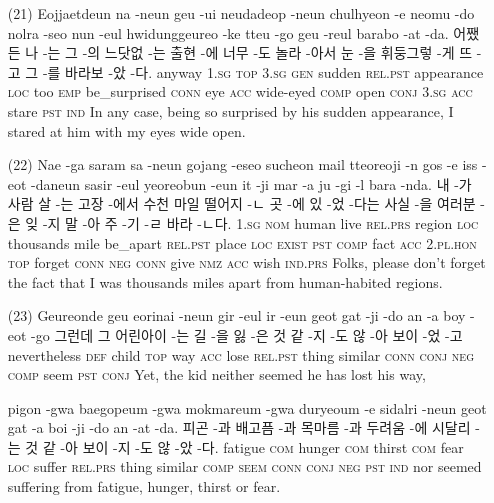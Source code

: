 \begin{itemize}
\item [(21)]
\tgl
		{Eojjaetdeun na -neun geu -ui neudadeop -neun chulhyeon -e neomu -do nolra -seo nun -eul hwidunggeureo -ke tteu -go geu -reul barabo -at -da.}
		{어쨌든 나 -는 그 -의 느닷없 -는 출현 -에 너무 -도 놀라 -아서 눈 -을 휘둥그렇 -게 뜨 -고 그 -를 바라보 -았 -다.}
		{anyway	\textsc{1.sg}	\textsc{top}	\textsc{3.sg}	\textsc{gen}	sudden	\textsc{rel.pst}	appearance	\textsc{loc}	too	\textsc{emp}	be\_surprised	\textsc{conn}	eye	\textsc{acc}	wide-eyed	\textsc{comp}	open	\textsc{conj}	\textsc{3.sg}	\textsc{acc}	stare	\textsc{pst}	\textsc{ind}}
		{In any case, being so surprised by his sudden appearance, I stared at him with my eyes wide open.}
		
\item [(22)]
\tgl
		{Nae -ga saram sa -neun gojang -eseo sucheon mail tteoreoji -n gos -e iss -eot -daneun sasir -eul yeoreobun -eun it -ji mar -a ju -gi -l bara -nda.}
		{내 -가 사람 살 -는 고장 -에서 수천 마일 떨어지 -ㄴ 곳 -에 있 -었 -다는 사실 -을 여러분 -은 잊 -지 말 -아 주 -기 -ㄹ 바라 -ㄴ다.}
		{\textsc{1.sg}	\textsc{nom}	human	live	\textsc{rel.prs}	region	\textsc{loc}	thousands	mile	be\_apart	\textsc{rel.pst}	place	\textsc{loc}	\textsc{exist}	\textsc{pst}	\textsc{comp}	fact	\textsc{acc}	\textsc{2.pl.hon}	\textsc{top}	forget	\textsc{conn}	\textsc{neg}	\textsc{conn}	give	\textsc{nmz}	\textsc{acc}	wish	\textsc{ind.prs}}
		{Folks, please don't forget the fact that I was thousands miles apart from human-habited regions.}
		
\item [(23)]
\tgl
		{Geureonde geu eorinai -neun gir -eul ir -eun geot gat -ji -do an -a boy -eot -go}
		{그런데 그 어린아이 -는 길 -을 잃 -은 것 같 -지 -도 않 -아 보이 -었 -고}
		{nevertheless	\textsc{def}	child	\textsc{top}	way	\textsc{acc}	lose	\textsc{rel.pst}	thing	similar	\textsc{conn}	\textsc{conj}	\textsc{neg}	\textsc{comp}	seem	\textsc{pst}	\textsc{conj}}
		{Yet, the kid neither seemed he has lost his way,}
		
\tgl
		{pigon -gwa baegopeum -gwa mokmareum -gwa duryeoum -e sidalri -neun geot gat -a boi -ji -do an -at -da.}
		{피곤 -과 배고픔 -과 목마름 -과 두려움 -에 시달리 -는 것 같 -아 보이 -지 -도 않 -았 -다.}
		{fatigue	\textsc{com}	hunger	\textsc{com}	thirst	\textsc{com}	fear	\textsc{loc}	suffer	\textsc{rel.prs}	thing	similar	\textsc{comp}	\textsc{seem}	\textsc{conn}	\textsc{conj}	\textsc{neg}	\textsc{pst}	\textsc{ind}}
		{nor seemed suffering from fatigue, hunger, thirst or fear.}
\end{itemize}

\pagebreak